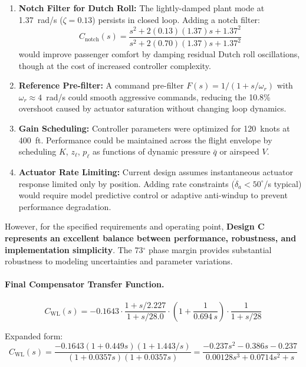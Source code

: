\begin{enumerate}
\item \textbf{Notch Filter for Dutch Roll:} The lightly-damped plant mode at 1.37~rad/s ($\zeta=0.13$) persists in closed loop. Adding a notch filter:
\[
C_{\text{notch}}(s) = \frac{s^2 + 2(0.13)(1.37)s + 1.37^2}{s^2 + 2(0.70)(1.37)s + 1.37^2}
\]
would improve passenger comfort by damping residual Dutch roll oscillations, though at the cost of increased controller complexity.

\item \textbf{Reference Pre-filter:} A command pre-filter $F(s) = 1/(1+s/\omega_r)$ with $\omega_r \approx 4$~rad/s could smooth aggressive commands, reducing the 10.8\% overshoot caused by actuator saturation without changing loop dynamics.

\item \textbf{Gain Scheduling:} Controller parameters were optimized for 120~knots at 400~ft. Performance could be maintained across the flight envelope by scheduling $K$, $z_\ell$, $p_\ell$ as functions of dynamic pressure $\bar{q}$ or airspeed $V$.

\item \textbf{Actuator Rate Limiting:} Current design assumes instantaneous actuator response limited only by position. Adding rate constraints ($\dot{\delta}_a < 50^\circ$/s typical) would require model predictive control or adaptive anti-windup to prevent performance degradation.
\end{enumerate}

However, for the specified requirements and operating point, \textbf{Design C represents an excellent balance between performance, robustness, and implementation simplicity}. The 73$^\circ$ phase margin provides substantial robustness to modeling uncertainties and parameter variations.

\paragraph{Final Compensator Transfer Function.}

\begin{equation}
\boxed{~
C_{\mathrm{WL}}(s) = -0.1643 \cdot
\frac{1 + s/2.227}{1 + s/28.0} \cdot
\left(1 + \frac{1}{0.694\,s}\right) \cdot
\frac{1}{1 + s/28}
~}
\label{eq:final_controller}
\end{equation}

Expanded form:
\begin{equation}
C_{\mathrm{WL}}(s) = \frac{-0.1643(1 + 0.449s)(1 + 1.443/s)}{(1 + 0.0357s)(1 + 0.0357s)}
= \frac{-0.237s^2 - 0.386s - 0.237}{0.00128s^3 + 0.0714s^2 + s}
\end{equation}

